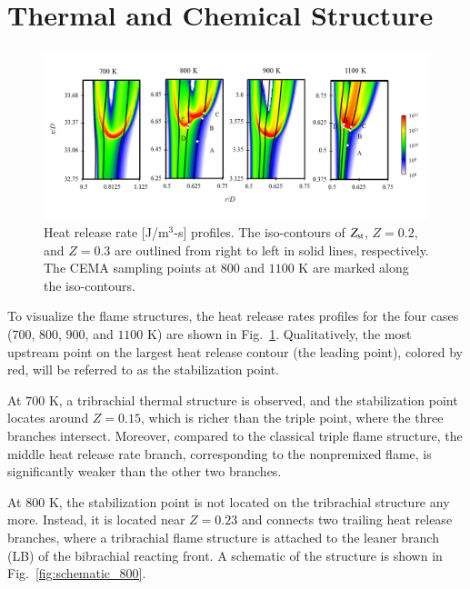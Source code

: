 \documentclass[review,3p,times]{elsarticle}
\begin{document}
\section{Thermal and Chemical Structure} \label{sec:structure}

\begin{figure}[t]
  \centering
  \scriptsize
  \vspace{-0.1in}
  \includegraphics[width=1.0\textwidth]{HRR.png}
  \normalsize
  \vspace{-0.1in}
  \caption{Heat release rate [J/m$^3$-s] profiles.  The iso-contours of $Z_{\rm st}$, $Z = 0.2$, and $Z = 0.3$ are outlined from right to left in solid lines, respectively.  The CEMA sampling points at $800$ and $1100$ K are marked along the iso-contours.}
  \label{fig:HRR}
\end{figure}

To visualize the flame structures, the heat release rates profiles for the four cases ($700$, $800$, $900$, and $1100$ K) are shown in Fig.~\ref{fig:HRR}.  Qualitatively, the most upstream point on the largest heat release contour (the leading point), colored by red, will be referred to as the stabilization point.  

At $700$ K, a tribrachial thermal structure is observed, and the stabilization point locates around $Z = 0.15$, which is richer than the triple point, where the three branches intersect.  Moreover, compared to the classical triple flame structure, the middle heat release rate branch, corresponding to the nonpremixed flame, is significantly weaker than the other two branches.  

At $800$ K, the stabilization point is not located on the tribrachial structure any more.  Instead, it is located near $Z = 0.23$ and connects two trailing heat release branches, where a tribrachial flame structure is attached to the leaner branch (LB) of the bibrachial reacting front.  A schematic of the structure is shown in Fig.~\ref{fig:schematic_800}.
\end{document}
